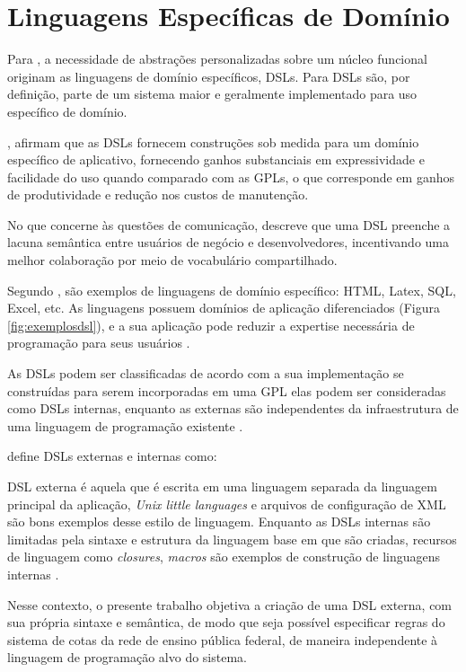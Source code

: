 \section{Linguagens Específicas de Domínio}
\label{sec:dsl}

Para , a necessidade de abstrações personalizadas sobre um núcleo funcional originam as linguagens de domínio específicos, \gls{DSL}s. Para  \gls{DSL}s são, por definição, parte de um sistema maior e geralmente implementado para uso específico de domínio.

, afirmam que as \gls{DSL}s fornecem construções sob medida para um domínio específico de aplicativo, fornecendo ganhos substanciais em expressividade e facilidade do uso quando comparado com as \gls{GPL}s, o que corresponde em ganhos de produtividade e redução nos custos de manutenção.

No que concerne às questões de comunicação,  descreve que uma \gls{DSL} preenche a lacuna semântica entre usuários de negócio e desenvolvedores, incentivando uma melhor colaboração por meio de vocabulário compartilhado.  

Segundo , são exemplos de linguagens de domínio específico: HTML, Latex, SQL, Excel, etc. As linguagens possuem domínios de aplicação diferenciados (Figura \ref{fig:exemplosdsl}), e a sua aplicação pode reduzir a expertise necessária de programação para seus usuários .




As \gls{DSL}s podem ser classificadas de acordo com a sua implementação se construídas para serem incorporadas em uma \gls{GPL} elas podem ser consideradas como \gls{DSL}s internas, enquanto as externas são independentes da infraestrutura de uma linguagem de programação existente \cite{dslengineering}.

 define \gls{DSL}s externas e internas como:

\begin{citacao} 
\gls{DSL} externa é aquela que é escrita em uma linguagem separada da linguagem principal da aplicação, \textit{Unix little languages} e arquivos de configuração de \gls{XML} são bons exemplos desse estilo de linguagem. Enquanto as \gls{DSL}s internas são limitadas pela sintaxe e estrutura da linguagem base em que são criadas, recursos de linguagem como \textit{closures}, \textit{macros} são exemplos de construção de linguagens internas \cite[s/p, tradução nossa]{fowler2005language}.
\end{citacao}


Nesse contexto, o presente trabalho objetiva a criação de uma \gls{DSL} externa, com sua própria sintaxe e semântica, de modo que seja possível especificar regras do sistema de cotas da rede de ensino pública federal, de maneira independente à linguagem de programação alvo do sistema. 



